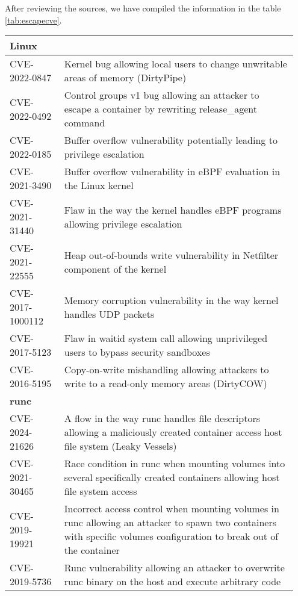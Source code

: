 After reviewing the sources, we have compiled the information in the table \ref{tab:escapecve}.


\begin{table}[hbt]
    \centering
    \begin{tabular}{| p{0.18\linewidth} | p{0.77\linewidth} |} \hline
        \multicolumn{2}{|l|}{\textbf{Linux}} \\ \hline
        CVE-2022-0847 & Kernel bug allowing local users to change unwritable areas of memory (DirtyPipe) \\ \hline
        CVE-2022-0492 & Control groups v1 bug allowing an attacker to escape a container by rewriting release\_agent command \\ \hline
        CVE-2022-0185 & Buffer overflow vulnerability potentially leading to privilege escalation \\ \hline
        CVE-2021-3490 & Buffer overflow vulnerability in eBPF evaluation in the Linux kernel \\ \hline
        CVE-2021-31440 & Flaw in the way the kernel handles eBPF programs allowing privilege escalation \\ \hline
        CVE-2021-22555 & Heap out-of-bounds write vulnerability in Netfilter component of the kernel \\ \hline
        CVE-2017-1000112 & Memory corruption vulnerability in the way kernel handles UDP packets \\ \hline
        CVE-2017-5123 & Flaw in waitid system call allowing unprivileged users to bypass security sandboxes \\ \hline
        CVE-2016-5195 & Copy-on-write mishandling allowing attackers to write to a read-only memory areas (DirtyCOW) \\ \hline
        \multicolumn{2}{|l|}{\textbf{runc}} \\ \hline
        CVE-2024-21626 & A flow in the way runc handles file descriptors allowing a maliciously created container access host file system (Leaky Vessels) \\ \hline
        CVE-2021-30465 & Race condition in runc when mounting volumes into several specifically created containers allowing host file system access \\ \hline
        CVE-2019-19921 & Incorrect access control when mounting volumes in runc allowing an attacker to spawn two containers with specific volumes configuration to break out of the container \\ \hline
        CVE-2019-5736 & Runc vulnerability allowing an attacker to overwrite runc binary on the host and execute arbitrary code  \\ \hline

\end{tabular}
\end{table}
